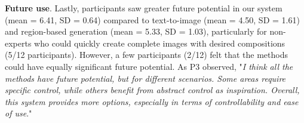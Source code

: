 \textbf{Future use}. Lastly, participants saw greater future potential in our system (mean = 6.41, SD = 0.64) compared to text-to-image (mean = 4.50, SD = 1.61) and region-based generation (mean = 5.33, SD = 1.03), particularly for non-experts who could quickly create complete images with desired compositions (5/12 participants). However, a few participants (2/12) felt that the methods could have equally significant future potential.
As P3 observed, "\emph{I think all the methods have future potential, but for different scenarios. Some areas require specific control, while others benefit from abstract control as inspiration. Overall, this system provides more options, especially in terms of controllability and ease of use}."













